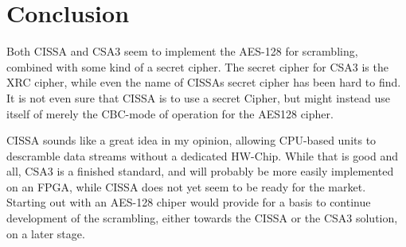 \section{Conclusion}
Both CISSA and CSA3 seem to implement the AES-128 for scrambling, combined with 
some kind of a secret cipher. The secret cipher for CSA3 is the XRC cipher, while
even the name of CISSAs secret cipher has been hard to find. It is not even sure 
that CISSA is to use a secret Cipher, but might instead use itself of merely the 
CBC-mode of operation for the AES128 cipher. 

CISSA sounds like a great idea in my opinion, allowing CPU-based units to 
descramble data streams without a dedicated HW-Chip. While that is good and all, 
CSA3 is a finished standard, and will probably be more easily implemented on an 
FPGA, while CISSA does not yet seem to be ready for the market. Starting out 
with an AES-128 chiper would provide for a basis to continue development of the 
scrambling, either towards the CISSA or the CSA3 solution, on a later stage.
